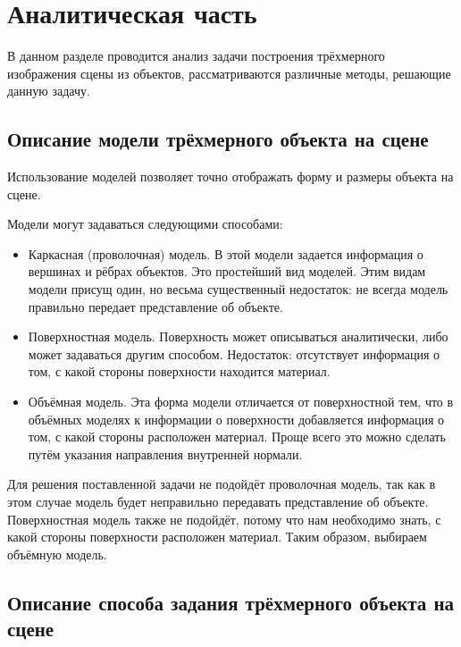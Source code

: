\chapter{Аналитическая часть}

В данном разделе проводится анализ задачи построения трёхмерного изображения сцены из объектов, рассматриваются различные методы, решающие данную задачу.

\section{Описание модели трёхмерного объекта на сцене}

Использование моделей позволяет точно отображать форму и размеры объекта на сцене.

Модели могут задаваться следующими способами:
\begin{itemize}
	\item Каркасная (проволочная) модель. В этой модели задается информация о вершинах и рёбрах объектов. Это простейший вид моделей. Этим видам модели присущ один, но весьма существенный недостаток: не всегда модель правильно передает представление об объекте.
	\item Поверхностная модель. Поверхность может описываться аналитически, либо может задаваться другим способом. Недостаток: отсутствует информация о том, с какой стороны поверхности находится материал.
	\item Объёмная модель. Эта форма модели отличается от поверхностной тем, что в объёмных моделях к информации
	о поверхности добавляется информация о том, с какой стороны расположен материал. Проще всего это можно сделать путём указания направления внутренней нормали.
\end{itemize}

Для решения поставленной задачи не подойдёт проволочная модель, так как в этом случае модель будет неправильно передавать представление об объекте. Поверхностная модель также не подойдёт, потому что нам необходимо знать, с какой стороны поверхности расположен материал. Таким образом, выбираем объёмную модель.

\section{Описание способа задания трёхмерного объекта на сцене}

